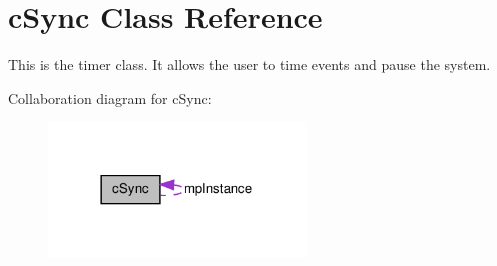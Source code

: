 \hypertarget{classc_sync}{
\section{cSync Class Reference}
\label{classc_sync}
}


This is the timer class. It allows the user to time events and pause the system.  




Collaboration diagram for cSync:\nopagebreak
\begin{figure}[H]
\begin{center}
\leavevmode
\includegraphics[width=194pt]{classc_sync__coll__graph}
\end{center}
\end{figure}
